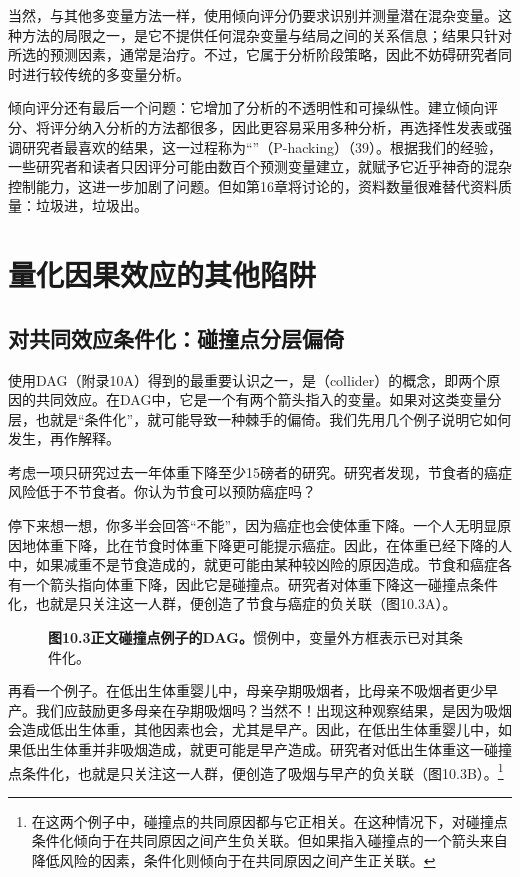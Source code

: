 当然，与其他多变量方法一样，使用倾向评分仍要求识别并测量潜在混杂变量。这种方法的局限之一，是它不提供任何混杂变量与结局之间的关系信息；结果只针对所选的预测因素，通常是治疗。不过，它属于分析阶段策略，因此不妨碍研究者同时进行较传统的多变量分析。

倾向评分还有最后一个问题：它增加了分析的不透明性和可操纵性。建立倾向评分、将评分纳入分析的方法都很多，因此更容易采用多种分析，再选择性发表或强调研究者最喜欢的结果，这一过程称为“”（P-hacking）（39）。根据我们的经验，一些研究者和读者只因评分可能由数百个预测变量建立，就赋予它近乎神奇的混杂控制能力，这进一步加剧了问题。但如第16章将讨论的，资料数量很难替代资料质量：垃圾进，垃圾出。

\section{量化因果效应的其他陷阱}
\subsection{对共同效应条件化：碰撞点分层偏倚}
使用DAG（附录10A）得到的最重要认识之一，是（collider）的概念，即两个原因的共同效应。在DAG中，它是一个有两个箭头指入的变量。如果对这类变量分层，也就是“条件化”，就可能导致一种棘手的偏倚。我们先用几个例子说明它如何发生，再作解释。

考虑一项只研究过去一年体重下降至少15磅者的研究。研究者发现，节食者的癌症风险低于不节食者。你认为节食可以预防癌症吗？

停下来想一想，你多半会回答“不能”，因为癌症也会使体重下降。一个人无明显原因地体重下降，比在节食时体重下降更可能提示癌症。因此，在体重已经下降的人中，如果减重不是节食造成的，就更可能由某种较凶险的原因造成。节食和癌症各有一个箭头指向体重下降，因此它是碰撞点。研究者对体重下降这一碰撞点条件化，也就是只关注这一人群，便创造了节食与癌症的负关联（图10.3A）。
\par
\begin{figure}[htbp]\centering\chTenColliders
\caption*{\textbf{图10.3\quad 正文碰撞点例子的DAG。}惯例中，变量外方框表示已对其条件化。}
\end{figure}
\par

再看一个例子。在低出生体重婴儿中，母亲孕期吸烟者，比母亲不吸烟者更少早产。我们应鼓励更多母亲在孕期吸烟吗？当然不！出现这种观察结果，是因为吸烟会造成低出生体重，其他因素也会，尤其是早产。因此，在低出生体重婴儿中，如果低出生体重并非吸烟造成，就更可能是早产造成。研究者对低出生体重这一碰撞点条件化，也就是只关注这一人群，便创造了吸烟与早产的负关联（图10.3B）。\footnote{在这两个例子中，碰撞点的共同原因都与它正相关。在这种情况下，对碰撞点条件化倾向于在共同原因之间产生负关联。但如果指入碰撞点的一个箭头来自降低风险的因素，条件化则倾向于在共同原因之间产生正关联。}


